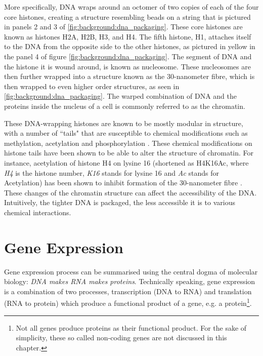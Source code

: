 \documentclass[parskip]{cs4rep}
\newcommand{\histonemodification}[1]{#1}
\begin{document}
More specifically, DNA wraps around an octomer of two copies of each of the four core histones, creating a structure resembling beads on a string that is pictured in panels 2 and 3 of \autoref{fig:background:dna_packaging}. These core histones are known as histones H2A, H2B, H3, and H4.
The fifth histone, H1, attaches itself to the DNA from the opposite side to the other histones, as pictured in yellow in the panel 4 of figure \ref{fig:background:dna_packaging}. The segment of DNA and the histone it is wound around, is known as nucleosome. These nucleosomes are then further wrapped into a structure known as the 30-nanometer fibre, which is then  wrapped to even higher order structures, as seen in \autoref{fig:background:dna_packaging}. The warped combination of DNA and the proteins inside the nucleus of a cell is commonly referred to as the chromatin.

These DNA-wrapping histones are known to be mostly modular in structure, with a number of ``tails" that are susceptible to chemical modifications such as methylation, acetylation and phosphorylation \cite{Fischle:2003tl,Kouzarides:2007js}. These chemical modifications on histone tails have been shown to be able to alter the structure of chromatin. For instance, acetylation of histone H4 on lysine 16 (shortened as \histonemodification{H4K16Ac}, where \emph{H4} is the histone number, \emph{K16} stands for lysine 16 and \emph{Ac} stands for Acetylation) has been shown to inhibit formation of the 30-nanometer fibre \cite{ShogrenKnaak:2006gt}. These changes of the chromatin structure can affect the accessibility of the DNA. Intuitively, the tighter DNA is packaged, the less accessible it is to various chemical interactions.

\section{Gene Expression}
Gene expression process can be summarised using the central dogma of molecular biology: 
\emph{DNA makes RNA makes proteins}. Technically speaking, gene expression is a combination of two processes, transcription (DNA to RNA) and
translation (RNA to protein) which produce a functional product of a gene, e.g. a protein\footnote{Not all genes produce proteins as their functional product. For the sake of simplicity, these so called non-coding genes are not discussed in this chapter.}.
\end{document}

